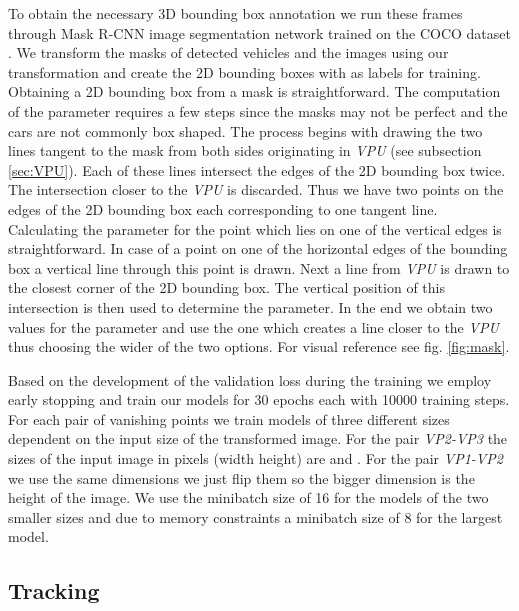 \documentclass[twocolumn]{svjour3}          \smartqed  \usepackage{graphicx}
\begin{document}
To obtain the necessary 3D bounding box annotation we run these frames through Mask R-CNN \cite{MaskRCNN} image segmentation network trained on the COCO dataset \cite{COCO}. We transform the masks of detected vehicles and the images using our transformation and create the 2D bounding boxes with  as labels for training. Obtaining a 2D bounding box from a mask is straightforward. The computation of the  parameter requires a few steps since the masks may not be perfect and the cars are not commonly box shaped. The process begins with drawing the two lines tangent to the mask from both sides originating in \textit{VPU} (see subsection \ref{sec:VPU}). Each of these lines intersect the edges of the 2D bounding box twice. The intersection closer to the \textit{VPU} is discarded. Thus we have two points on the edges of the 2D bounding box each corresponding to one tangent line. Calculating the  parameter for the point which lies on one of the vertical edges is straightforward. In case of a point on one of the horizontal edges of the bounding box a vertical line through this point is drawn. Next a line from \textit{VPU} is drawn to the closest corner of the 2D bounding box. The vertical position of this intersection is then used to determine the  parameter. In the end we obtain two values for the  parameter and use the one which creates a line closer to the \textit{VPU} thus choosing the wider of the two options. For visual reference see fig. \ref{fig:mask}.

\label{sec:variants}
Based on the development of the validation loss during the training we employ early stopping and train our models for 30 epochs each with 10000 training steps. For each pair of vanishing points we train models of three different sizes dependent on the input size of the transformed image. For the pair \textit{VP2-VP3} the sizes of the input image in pixels (width  height) are  and . For the pair \textit{VP1-VP2} we use the same dimensions we just flip them so the bigger dimension is the height of the image. We use the minibatch size of 16 for the models of the two smaller sizes and due to memory constraints a minibatch size of 8 for the largest model.

\subsection{Tracking}
\end{document}
